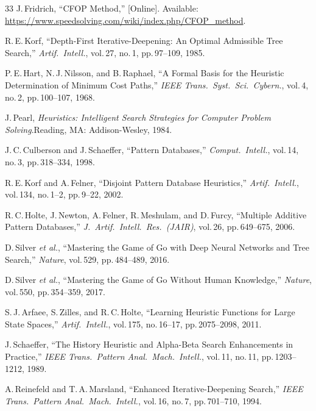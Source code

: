 \documentclass[conference]{IEEEtran}
\begin{document}
\begin{thebibliography}{33}
J.\,Fridrich, ``CFOP Method,'' [Online]. Available:
\url{https://www.speedsolving.com/wiki/index.php/CFOP_method}.


R.\,E.\,Korf, ``Depth-First Iterative-Deepening: An Optimal
Admissible Tree Search,'' \textit{Artif.\ Intell.}, vol.\,27,
no.\,1, pp.\,97--109, 1985.

P.\,E.\,Hart, N.\,J.\,Nilsson, and B.\,Raphael, ``A Formal Basis
for the Heuristic Determination of Minimum Cost Paths,''
\textit{IEEE Trans.\ Syst.\ Sci.\ Cybern.}, vol.\,4, no.\,2,
pp.\,100--107, 1968.

J.\,Pearl, \textit{Heuristics: Intelligent Search Strategies for
Computer Problem Solving}.\quad Reading, MA: Addison-Wesley, 1984.

J.\,C.\,Culberson and J.\,Schaeffer, ``Pattern Databases,''
\textit{Comput.\ Intell.}, vol.\,14, no.\,3, pp.\,318--334, 1998.

R.\,E.\,Korf and A.\,Felner, ``Disjoint Pattern Database
Heuristics,'' \textit{Artif.\ Intell.}, vol.\,134, no.\,1--2,
pp.\,9--22, 2002.

R.\,C.\,Holte, J.\,Newton, A.\,Felner, R.\,Meshulam, and
D.\,Furcy, ``Multiple Additive Pattern Databases,'' \textit{J.\
Artif.\ Intell.\ Res.\ (JAIR)}, vol.\,26, pp.\,649--675, 2006.

D.\,Silver \textit{et al.}, ``Mastering the Game of {G}o with Deep
Neural Networks and Tree Search,'' \textit{Nature}, vol.\,529,
pp.\,484--489, 2016.

D.\,Silver \textit{et al.}, ``Mastering the Game of {G}o Without
Human Knowledge,'' \textit{Nature}, vol.\,550, pp.\,354--359, 2017.

S.\,J.\,Arfaee, S.\,Zilles, and R.\,C.\,Holte, ``Learning
Heuristic Functions for Large State Spaces,'' \textit{Artif.\
Intell.}, vol.\,175, no.\,16--17, pp.\,2075--2098, 2011.

J.\,Schaeffer, ``The History Heuristic and Alpha-Beta Search
Enhancements in Practice,'' \textit{IEEE Trans.\ Pattern Anal.\
Mach.\ Intell.}, vol.\,11, no.\,11, pp.\,1203--1212, 1989.

\bibitem{reinefeld1994}
A.\,Reinefeld and T.\,A.\,Marsland, ``Enhanced Iterative-Deepening
Search,'' \textit{IEEE Trans.\ Pattern Anal.\ Mach.\ Intell.},
vol.\,16, no.\,7, pp.\,701--710, 1994.


\end{thebibliography}
\end{document}
